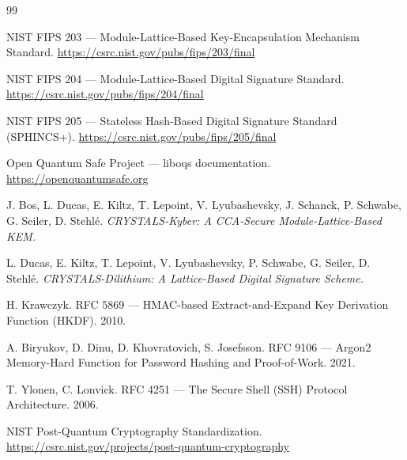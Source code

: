 \documentclass[12pt,a4paper]{article}
\begin{document}
\begin{thebibliography}{99}

NIST FIPS 203 --- Module-Lattice-Based Key-Encapsulation Mechanism Standard.
\url{https://csrc.nist.gov/pubs/fips/203/final}

NIST FIPS 204 --- Module-Lattice-Based Digital Signature Standard.
\url{https://csrc.nist.gov/pubs/fips/204/final}

NIST FIPS 205 --- Stateless Hash-Based Digital Signature Standard (SPHINCS+).
\url{https://csrc.nist.gov/pubs/fips/205/final}

Open Quantum Safe Project --- liboqs documentation.
\url{https://openquantumsafe.org}

J. Bos, L. Ducas, E. Kiltz, T. Lepoint, V. Lyubashevsky, J. Schanck, P. Schwabe, G. Seiler, D. Stehlé.
\emph{CRYSTALS-Kyber: A CCA-Secure Module-Lattice-Based KEM.}

L. Ducas, E. Kiltz, T. Lepoint, V. Lyubashevsky, P. Schwabe, G. Seiler, D. Stehlé.
\emph{CRYSTALS-Dilithium: A Lattice-Based Digital Signature Scheme.}

H. Krawczyk. RFC 5869 --- HMAC-based Extract-and-Expand Key Derivation Function (HKDF). 2010.

A. Biryukov, D. Dinu, D. Khovratovich, S. Josefsson.
RFC 9106 --- Argon2 Memory-Hard Function for Password Hashing and Proof-of-Work. 2021.

T. Ylonen, C. Lonvick. RFC 4251 --- The Secure Shell (SSH) Protocol Architecture. 2006.

NIST Post-Quantum Cryptography Standardization.
\url{https://csrc.nist.gov/projects/post-quantum-cryptography}

\end{thebibliography}
\end{document}
